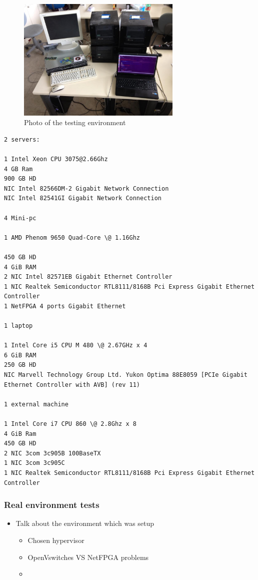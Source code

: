 \documentclass[12pt,english,oneside]{book}
\begin{document}
\begin{figure}[htbp]
        \centering
        \includegraphics[width=0.7\textwidth]{figures/realenvironment.jpg}
        \caption{Photo of the testing environment}
        \label{fig:realenv}
\end{figure}

\begin{verbatim}
2 servers:

1 Intel Xeon CPU 3075@2.66Ghz
4 GB Ram
900 GB HD
NIC Intel 82566DM-2 Gigabit Network Connection
NIC Intel 82541GI Gigabit Network Connection

4 Mini-pc

1 AMD Phenom 9650 Quad-Core \@ 1.16Ghz

450 GB HD
4 GiB RAM
2 NIC Intel 82571EB Gigabit Ethernet Controller
1 NIC Realtek Semiconductor RTL8111/8168B Pci Express Gigabit Ethernet Controller
1 NetFPGA 4 ports Gigabit Ethernet

1 laptop

1 Intel Core i5 CPU M 480 \@ 2.67GHz x 4 
6 GiB RAM
250 GB HD
NIC Marvell Technology Group Ltd. Yukon Optima 88E8059 [PCIe Gigabit Ethernet Controller with AVB] (rev 11)

1 external machine

1 Intel Core i7 CPU 860 \@ 2.8Ghz x 8 
4 GiB Ram
450 GB HD
2 NIC 3com 3c905B 100BaseTX
1 NIC 3com 3c905C
1 NIC Realtek Semiconductor RTL8111/8168B Pci Express Gigabit Ethernet Controller

\end{verbatim}

\subsubsection{Real environment tests}
\begin{itemize}
  \item Talk about the environment which was setup
  \begin{itemize}
    \item Chosen hypervisor
    \item OpenVswitches VS NetFPGA problems
    \item 
  \end{itemize}
\end{itemize}
\end{document}

